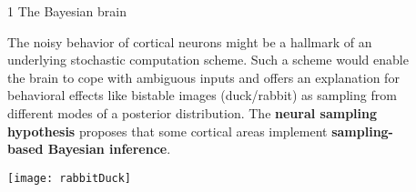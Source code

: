 \newcommand{\blockSpaceOne}{\vspace{1.3cm}}
\newcommand{\interBlockSpaceOne}{\vspace{1.5cm}}
\newcommand{\blockSpaceTwo}{\vspace{1.3cm}}
\newcommand{\interBlockSpaceTwo}{\vspace{.95cm}}
\newcommand{\secondBlockImSpace}{\vspace{.25cm}}
\newcommand{\thirdBlockImSpace}{\vspace{1.125cm}}

\begin{frame} %
	\vspace{-.5cm}
	\begin{columns}
		\begin{column}{.005\textwidth}\end{column}

		
		\begin{column}{0.99\textwidth}
			\begin{columns}[t]

				\begin{column}{.01\textwidth}\end{column}

				\begin{column}{0.32\textwidth}


					\begin{block}{\large 1 The Bayesian brain}
					\blockSpaceOne


					\justifying
					\begin{adjustwidth}{1.cm}{1.cm}
					 The noisy behavior of cortical neurons might be a hallmark of an underlying stochastic computation scheme.
					 Such a scheme would enable the brain to cope with ambiguous inputs and offers an explanation for behavioral effects like bistable images (duck/rabbit) as sampling from different modes of a posterior distribution.
					 The \textbf{neural sampling hypothesis} \cite{fiser2010statistically} proposes that some cortical areas implement \textbf{sampling-based Bayesian inference}.

					\end{adjustwidth}

					\thirdBlockImSpace
					\vspace{0.49cm}
					\begin{center}
						\texttt{[image: rabbitDuck]}
					\end{center}
					\vspace{0.49cm}
					\thirdBlockImSpace


\end{block}
\end{column}
\end{columns}
\end{column}
\end{columns}
\end{frame}
